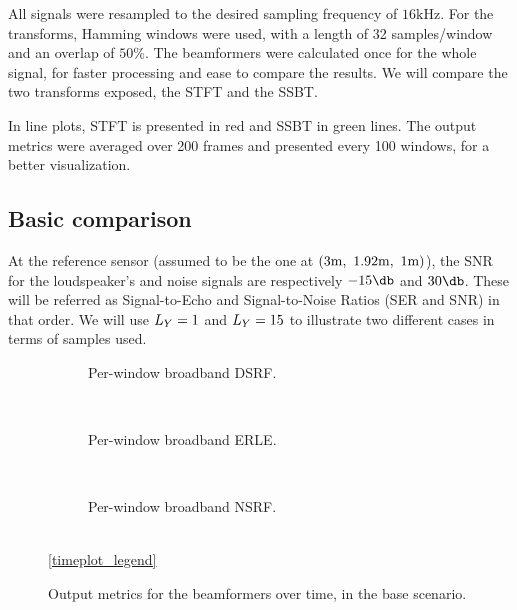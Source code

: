 All signals were resampled to the desired sampling frequency of $16\si{\kilo\hertz}$. For the transforms, Hamming windows were used, with a length of 32 samples/window and an overlap of $50\%$. The beamformers were calculated once for the whole signal, for faster processing and ease to compare the results. We will compare the two transforms exposed, the STFT and the SSBT.

In line plots, STFT is presented in red and SSBT in green lines. The output metrics were averaged over 200 frames and presented every 100 windows, for a better visualization.
%

\subsection{Basic comparison}
At the reference sensor (assumed to be the one at $(3\si{\meter},~1.92\si{\meter},~1\si{\meter})$), the SNR for the loudspeaker's and noise signals are respectively $-15\dB$ and $30\dB$. These will be referred as Signal-to-Echo and Signal-to-Noise Ratios (SER and SNR) in that order. We will use $\Ly = 1$ and $\Ly = 15$ to illustrate two different cases in terms of samples used.


\begin{figure}[!ht]
	\centering
	\begin{subfigure}{\textwidth}
		\centering
		
		\caption{Per-window broadband DSRF.}
		\label{subfig:lineplot__DSRF_l__iSER_n15__err_0}
	\end{subfigure}\\[1em]
	\begin{subfigure}{\textwidth}
		\centering
		
		\caption{Per-window broadband ERLE.}
		\label{subfig:lineplot__gSER_l__iSER_n15__err_0}
	\end{subfigure}\\[1em]
	\begin{subfigure}{\textwidth}
		\centering
		
		\caption{Per-window broadband NSRF.}
		\label{subfig:lineplot__gSNR_l__iSER_n15__err_0}
	\end{subfigure}\\[1em]
	\ref*{timeplot_legend}
	\caption{Output metrics for the beamformers over time, in the base scenario.}
	\label{fig:lineplot__iSER_n15__Ly_1__err_0}
\end{figure}

